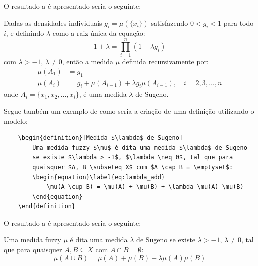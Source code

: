 \begin{enumerate}
	O resultado a é apresentado seria o seguinte:

	\begin{theorem}
		Dadas as densidades individuais $g_i = \mu(\{x_i\})$ satisfazendo $0 < g_i < 1$ para todo $i$, e definindo $\lambda$ como a raiz única da equação:
		\begin{equation}\label{eq:lambda_eq}
			1 + \lambda = \prod_{i=1}^{n} (1 + \lambda g_i)
		\end{equation}
		com $\lambda > -1$, $\lambda \neq 0$, então a medida $\mu$ definida recursivamente por:
		\begin{align}
			\mu(A_1) &= g_1 \nonumber \\
			\mu(A_i) &= g_i + \mu(A_{i-1}) + \lambda g_i \mu(A_{i-1}), \quad i = 2,3,\dots,n \label{eq:recursive}
		\end{align}
		onde $A_i = \{x_1, x_2, \dots, x_i\}$, é uma medida $\lambda$ de Sugeno.
	\end{theorem}
	
	Segue também um exemplo de como seria a criação de uma definição utilizando o modelo:
	
	\begin{verbatim}
	\begin{definition}[Medida $\lambda$ de Sugeno]
		Uma medida fuzzy $\mu$ é dita uma medida $\lambda$ de Sugeno 
		se existe $\lambda > -1$, $\lambda \neq 0$, tal que para 
		quaisquer $A, B \subseteq X$ com $A \cap B = \emptyset$:
		\begin{equation}\label{eq:lambda_add}
			\mu(A \cup B) = \mu(A) + \mu(B) + \lambda \mu(A) \mu(B)
		\end{equation}
	\end{definition}
	\end{verbatim}
	
	O resultado a é apresentado seria o seguinte:

	\begin{definition}
		Uma medida fuzzy $\mu$ é dita uma medida $\lambda$ de Sugeno se existe $\lambda > -1$, $\lambda \neq 0$, tal que para quaisquer $A, B \subseteq X$ com $A \cap B = \emptyset$:
		\begin{equation}\label{eq:lambda_add}
			\mu(A \cup B) = \mu(A) + \mu(B) + \lambda \mu(A) \mu(B)
		\end{equation}
	\end{definition}

\end{enumerate}